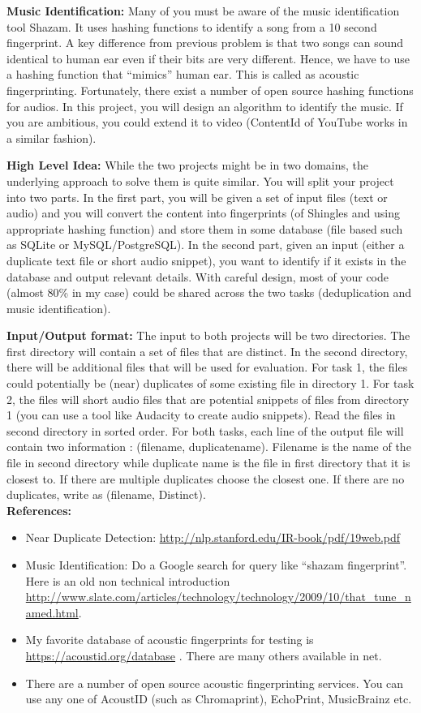 \documentclass[12pt]{article}
\begin{document}
{\bf Music Identification:}
Many of you must be aware of the music identification tool Shazam. 
It uses hashing functions to identify a song from a 10 second fingerprint.
A key difference from previous problem is that two songs can sound identical to human ear even if their bits are very different.
Hence, we have to use a hashing function that ``mimics'' human ear.
This is called as acoustic fingerprinting.
Fortunately, there exist a number of open source hashing functions for audios.
In this project, you will design an algorithm to identify the music.
If you are ambitious, you could extend it to video (ContentId of YouTube works in a similar fashion).

{\bf High Level Idea:}
While the two projects might be in two domains, the underlying approach to solve them is quite similar.
You will split your project into two parts.
In the first part, you will be given a set of input files (text or audio) and 
you will convert the content into fingerprints (of Shingles and using appropriate hashing function) 
and store them in some database (file based such as SQLite or MySQL/PostgreSQL).
In the second part, given an input (either a duplicate text file or short audio snippet),
you want to identify if it exists in the database and output relevant details.
With careful design, most of your code (almost 80\% in my case) could be shared across the two tasks (deduplication and music identification).

{\bf Input/Output format:}
The input to both projects will be two directories.
The first directory will contain a set of files that are distinct.
In the second directory, there will be additional files that will be used for evaluation.
For task 1, the files could potentially be (near) duplicates of some existing file in directory 1.
For task 2, the files will short audio files that are potential snippets of files from directory 1
(you can use a tool like Audacity to create audio snippets).
Read the files in second directory in sorted order. 
For both tasks, each line of the output file will contain two information : (filename, duplicatename).
Filename is the name of the file in second directory while duplicate name is the file in first directory that it is closest to.
If there are multiple duplicates choose  the closest one.
If there are no duplicates, write as (filename, Distinct).\\

{\bf References:}
\begin{itemize}
    \item Near Duplicate Detection: \url{http://nlp.stanford.edu/IR-book/pdf/19web.pdf}
    \item Music Identification: Do a Google search for query like ``shazam fingerprint''. Here is an old non technical introduction \url{http://www.slate.com/articles/technology/technology/2009/10/that_tune_named.html}.
    \item My favorite database of acoustic fingerprints for testing is \url{https://acoustid.org/database} . There are many others available in net.
    \item There are a number of open source acoustic fingerprinting services. You can use any one of AcoustID (such as Chromaprint), EchoPrint, MusicBrainz etc.
\end{itemize}
\end{document}
